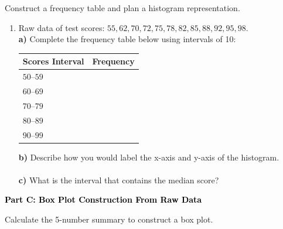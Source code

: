 \documentclass[12pt, letterpaper, fleqn]{article}
\newcommand{\blanklong}{\underline{\hspace{6.5cm}}}
\newcommand{\blankshorter}{\underline{\hspace{1.5cm}}}
\begin{document}
\vspace{3mm}

\noindent
Construct a frequency table and plan a histogram representation.

\vspace{5mm}

\begin{enumerate}[itemsep=2.5cm, leftmargin=0.6cm]
\item Raw data of test scores: $55, 62, 70, 72, 75, 78, 82, 85, 88, 92, 95, 98$. \\
\textbf{a)} Complete the frequency table below using intervals of 10:
\begin{center}
\begin{tabular}{|l|c|}
\hline
\textbf{Scores Interval} & \textbf{Frequency} \\ \hline
$50\text{--}59$ & \blankshorter \\ \hline
$60\text{--}69$ & \blankshorter \\ \hline
$70\text{--}79$ & \blankshorter \\ \hline
$80\text{--}89$ & \blankshorter \\ \hline
$90\text{--}99$ & \blankshorter \\
\hline
\end{tabular}
\end{center}
\vspace{0.5cm}

\textbf{b)} Describe how you would label the x-axis and y-axis of the histogram. \\
\blanklong \\
\textbf{c)} What is the interval that contains the median score? \\
\blanklong
\end{enumerate}

\newpage

\begin{tcolorbox}[colback=black!10]
    \large\textcolor{black}{\textbf{Part C: Box Plot Construction From Raw Data}}
\end{tcolorbox}

\vspace{3mm}

\noindent
Calculate the 5-number summary to construct a box plot.

\vspace{5mm}
\end{document}
